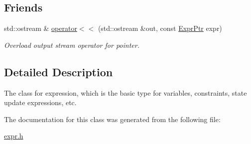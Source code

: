 \subsection*{Friends}
\begin{DoxyCompactItemize}
\item 
\mbox{\label{classilang_1_1_expr_a54f39f89237980d51dc32f4a9bae4f77}} 
std\+::ostream \& \mbox{\hyperlink{classilang_1_1_expr_a54f39f89237980d51dc32f4a9bae4f77}{operator$<$$<$}} (std\+::ostream \&out, const \mbox{\hyperlink{classilang_1_1_expr_a85952b6a34620c4c8cab6bac9c9fdf8c}{Expr\+Ptr}} expr)
\begin{DoxyCompactList}\small\item\em Overload output stream operator for pointer. \end{DoxyCompactList}\end{DoxyCompactItemize}


\subsection{Detailed Description}
The class for expression, which is the basic type for variables, constraints, state update expressions, etc. 

The documentation for this class was generated from the following file\+:\begin{DoxyCompactItemize}
\item 
\mbox{\hyperlink{expr_8h}{expr.\+h}}\end{DoxyCompactItemize}
